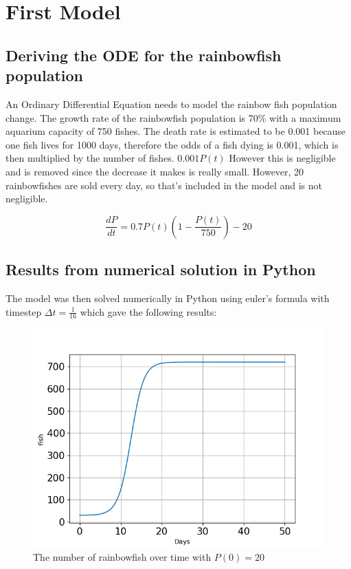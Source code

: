 \section{First Model}

\subsection{Deriving the ODE for the rainbowfish population}

\begin{flushleft}
    An Ordinary Differential Equation needs to model the rainbow fish population change.
    The growth rate of the rainbowfish population is 70\% with
    a maximum aquarium capacity of 750 fishes. The death rate is
    estimated to be 0.001 because one fish lives for 1000
    days, therefore the odds of a fish dying is 0.001, which is then
    multiplied by the number of fishes. $0.001P(t)$
    However this is negligible and is
    removed since the decrease it makes is really small.
    However, 20 rainbowfishes are sold every day,
    so that's included in the model and is not negligible.
\end{flushleft}

\begin{equation}
    \frac{dP}{dt} = 0.7P(t)(1-\frac{P(t)}{750})-20
\end{equation}

\subsection{Results from numerical solution in Python}
\begin{flushleft}

    The model was then solved numerically in Python using
    euler's formula with timestep $\Delta t=\frac{1}{16}$
    which gave the following results:

\end{flushleft}

\begin{figure}[H]
    \centering
    \includegraphics[scale=0.4]{../figures/Figure_1.png}
    \caption{The number of rainbowfish over time with $P(0)=20$}
\end{figure}

